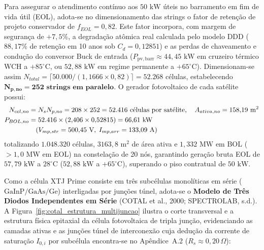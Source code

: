 Para assegurar o atendimento contínuo aos $50\text{ kW}$ úteis no barramento em fim de vida útil (EOL), adota-se no dimensionamento das strings o fator de retenção de projeto conservador de $f_{EOL} = 0{,}82$. Este fator incorpora, com margem de segurança de $+7{,}5\%$, a degradação atômica real calculada pelo modelo DDD ($88{,}17\%$ de retenção em 10 anos sob $C_d = 0{,}12851$) e as perdas de chaveamento e condução do conversor Buck de entrada ($P_{\mathrm{pv,barr}} \approx 44{,}45\text{ kW}$ em cruzeiro térmico WCH a $+85^\circ\text{C}$, ou $52{,}88\text{ kW}$ em regime permanente a $+65^\circ\text{C}$). Dimensionam-se assim $N_{total} = \lceil 50.000 / (1{,}1666 \times 0{,}82) \rceil = 52.268$ células, estabelecendo $\mathbf{N_{p,no} = 252\text{ strings em paralelo}}$. O gerador fotovoltaico de cada satélite possui:
\begin{align}
    N_{cel,no} &= N_s N_{p,no} = 208 \times 252 = 52.416\text{ células por satélite}, \quad A_{ativa,no} = 158{,}19\text{ m}^2 \label{eq:n_cel_no} \\
    P_{BOL,no} &= 52.416 \times (2{,}406 \times 0{,}52815) = 66{,}61\text{ kW} \notag \\
               &\quad (V_{mp,str}=500{,}45\text{ V}, \; I_{mp,arr}=133{,}09\text{ A}) \label{eq:area_no}
\end{align}
totalizando $1.048.320$ células, $3163{,}8\text{ m}^2$ de área ativa e $1{,}332\text{ MW}$ em BOL ($> 1{,}0\text{ MW}$ em EOL) na constelação de 20 nós, garantindo geração bruta EOL de $57{,}79\text{ kW}$ a $28^\circ\text{C}$ ($52{,}88\text{ kW}$ a $+65^\circ\text{C}$), superando o piso contratual de $50\text{ kW}$.

Como a célula XTJ Prime consiste em três subcélulas monolíticas em série ($\text{GaInP}/\allowbreak\text{GaAs}/\allowbreak\text{Ge}$) interligadas por junções túnel, adota-se o \textbf{Modelo de Três Diodos Independentes em Série} (COTAL et al., 2000; SPECTROLAB, s.d.). A Figura~\ref{fig:cotal_estrutura_multijuncao} ilustra o corte transversal e a estrutura física epitaxial da célula fotovoltaica de tripla junção, evidenciando as camadas ativas e as junções túnel de interconexão cuja dedução da corrente de saturação $I_{0,i}$ por subcélula encontra-se no Apêndice~A.2 ($R_s \approx 0{,}20\,\Omega$):

